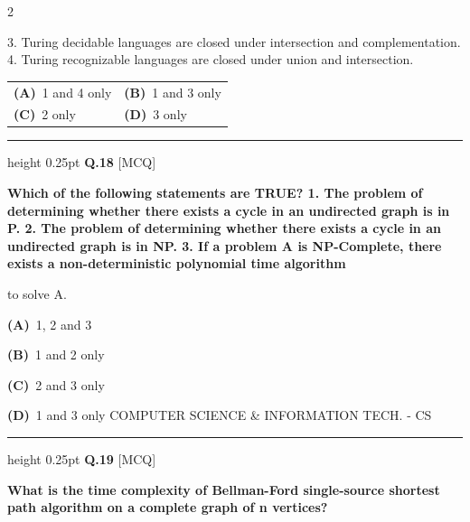 \documentclass[a4paper,10pt,twoside]{article}
\begin{document}
\begin{multicols}{2}
{3. Turing decidable languages are closed under intersection and complementation.
4. Turing recognizable languages are closed under union and intersection. \par}
\par\vspace{2pt}\noindent
\begin{tabular*}{\columnwidth}{@{\extracolsep{\fill}}p{}p{}@{}}
\textbf{(A)}~1 and 4 only & \textbf{(B)}~1 and 3 only \\
\addlinespace[2pt]
\textbf{(C)}~2 only & \textbf{(D)}~3 only
\end{tabular*}
\par\vspace{6pt}\hrule height 0.25pt\vspace{6pt}
\noindent\textbf{Q.18} \hfill {\footnotesize\textsf{[MCQ]}}
\par\vspace{2pt}
{\bfseries Which of the following statements are TRUE?
1.
The problem of determining whether there exists a cycle in an undirected graph is in P.
2.
The problem of determining whether there exists a cycle in an undirected graph is in NP.
3.
If a problem A is NP-Complete, there exists a non-deterministic polynomial time algorithm
\par\smallskip
to solve A. \par}
\par\vspace{2pt}\noindent
\textbf{(A)}~1, 2 and 3\par\vspace{2pt}\noindent
\textbf{(B)}~1 and 2 only\par\vspace{2pt}\noindent
\textbf{(C)}~2 and 3 only\par\vspace{2pt}\noindent
\textbf{(D)}~1 and 3 only  COMPUTER SCIENCE \& INFORMATION TECH. - CS
\par\vspace{6pt}\hrule height 0.25pt\vspace{6pt}
\noindent\textbf{Q.19} \hfill {\footnotesize\textsf{[MCQ]}}
\par\vspace{2pt}
{\bfseries What is the time complexity of Bellman-Ford single-source shortest path algorithm on a complete
graph of n vertices? \par}
\par\vspace{2pt}\noindent

\end{multicols}
\end{document}
